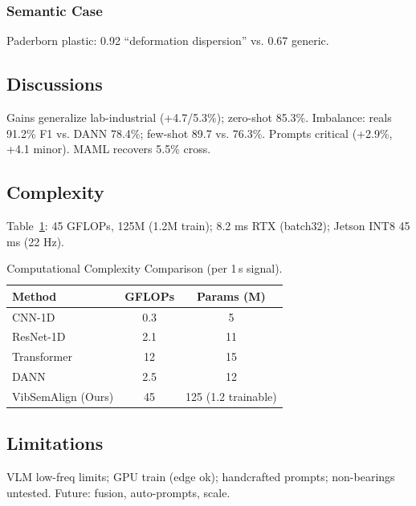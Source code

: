 \subsubsection{Semantic Case}
Paderborn plastic: 0.92 ``deformation dispersion'' vs. 0.67 generic.

\subsection{Discussions}

Gains generalize lab-industrial (+4.7/5.3\%); zero-shot 85.3\%. Imbalance: reals 91.2\% F1 vs. DANN 78.4\%; few-shot 89.7 vs. 76.3\%. Prompts critical (+2.9\%, +4.1 minor). MAML recovers 5.5\% cross.

\subsection{Complexity}

Table~\ref{tab:vii}: 45 GFLOPs, 125M (1.2M train); 8.2 ms RTX (batch32); Jetson INT8 45 ms (22 Hz).

\begin{table}[htbp]
\centering
\caption{Computational Complexity Comparison (per 1\,s signal).}
\label{tab:vii}
\begin{tabular}{@{}lcc@{}}
\toprule
Method & GFLOPs & Params (M) \\
\midrule
CNN-1D \cite{wen2019convolutional} & 0.3 & 5 \\
ResNet-1D \cite{he2016deep} & 2.1 & 11 \\
Transformer \cite{vaswani2017attention} & 12 & 15 \\
DANN \cite{ganin2016domain} & 2.5 & 12 \\
\midrule
VibSemAlign (Ours) & 45 & 125 (1.2 trainable) \\
\bottomrule
\end{tabular}
\end{table}

\subsection{Limitations}

VLM low-freq limits; GPU train (edge ok); handcrafted prompts; non-bearings untested. Future: fusion, auto-prompts, scale.